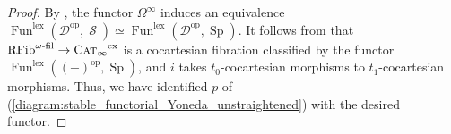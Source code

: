\documentclass{article}
\DeclareMathOperator{\CAT}{C\normalfont\textsc{at}_\infty} %
\DeclareMathOperator{\Fun}{Fun} %
\DeclareMathOperator{\Spectra}{Sp} %
\DeclareMathOperator{\Spaces}{\mathcal{S}} %
\newcommand{\op}{\mathrm{op}}
\theoremstyle{definition}
\newcommand{\Lucy}[1]{\todo[color=cyan!30]{\footnotesize L: #1}}
\begin{document}
\begin{proof}
    By \cite[Corollary 1.4.2.23]{LurHA}, the functor $ \Omega^\infty $ induces an equivalence $ \Fun^{\mathrm{lex}}\left(\mathcal{D}^\op,\Spaces\right) \simeq \Fun^{\mathrm{lex}}\left(\mathcal{D}^\op,\Spectra\right) $.  
    It follows from \cite[Lemma 1.4.1(i)]{CDHHLMNNSI} that $ \mathrm{RFib}^{\omega\text{-fil}} \to \CAT^{\mathrm{ex}} $ is a cocartesian fibration classified by the functor $ \Fun^{\mathrm{lex}}\left((-)^\op,\Spectra\right) $, and $ i $ takes $ t_0 $-cocartesian morphisms to $ t_1 $-cocartesian morphisms.     
    Thus, we have identified $ p $ of (\ref{diagram:stable_functorial_Yoneda_unstraightened}) with the desired functor.  
\end{proof}
\end{document}
